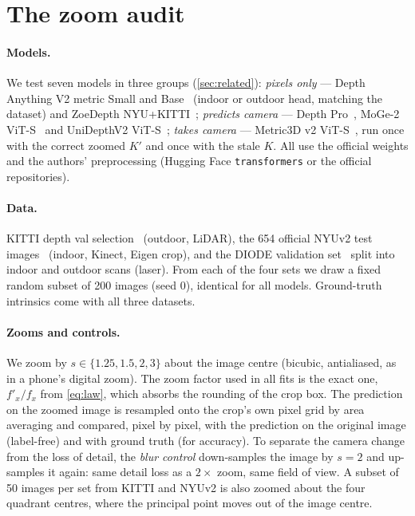 \section{The zoom audit}
\label{sec:audit}

\paragraph{Models.}
We test seven models in three groups (\cref{sec:related}):
\emph{pixels only} --- Depth Anything V2 metric Small and Base~\cite{yang2024dav2} (indoor
or outdoor head, matching the dataset) and ZoeDepth NYU+KITTI~\cite{bhat2023zoedepth};
\emph{predicts camera} --- Depth Pro~\cite{bochkovskii2025depthpro},
MoGe-2 ViT-S~\cite{wang2025moge2} and UniDepthV2 ViT-S~\cite{piccinelli2025unidepthv2};
\emph{takes camera} --- Metric3D v2 ViT-S~\cite{hu2024metric3dv2}, run once with the correct
zoomed $K'$ and once with the stale $K$.
All use the official weights and the authors' preprocessing (Hugging Face
\texttt{transformers} or the official repositories).

\paragraph{Data.}
KITTI depth val selection~\cite{geiger2013kitti,uhrig2017sparsity} (outdoor, LiDAR),
the 654 official NYUv2 test images~\cite{silberman2012nyu} (indoor, Kinect, Eigen crop),
and the DIODE validation set~\cite{vasiljevic2019diode} split into indoor and outdoor scans
(laser). From each of the four sets we draw a fixed random subset of 200 images (seed 0),
identical for all models. Ground-truth intrinsics come with all three datasets.

\paragraph{Zooms and controls.}
We zoom by $s\in\{1.25, 1.5, 2, 3\}$ about the image centre (bicubic, antialiased, as in a
phone's digital zoom). The zoom factor used in all fits is the exact one, $f'_x/f_x$ from
\cref{eq:law}, which absorbs the rounding of the crop box. The prediction on the zoomed image
is resampled onto the crop's own pixel grid by area averaging and compared, pixel by pixel,
with the prediction on the original image (label-free) and with ground truth (for accuracy).
To separate the camera change from the loss of detail, the \emph{blur control} down-samples
the image by $s=2$ and up-samples it again: same detail loss as a $2\times$ zoom, same field of
view. A subset of 50 images per set from KITTI and NYUv2 is also zoomed about the four
quadrant centres, where the principal point moves out of the image centre.

